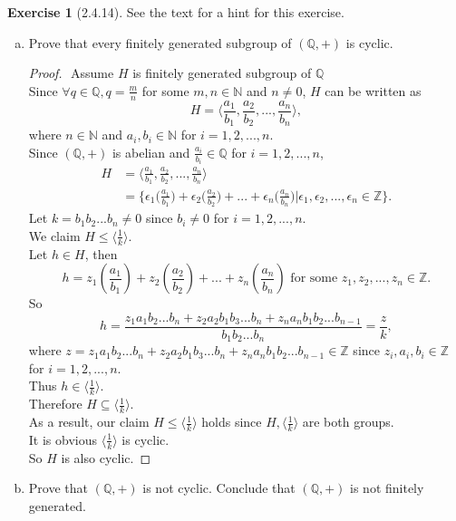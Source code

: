 \documentclass{amsart}
\newcommand{\bbz}{\mathbb{Z}}
\newcommand{\bbq}{\mathbb{Q}}
\newcommand{\bbn}{\mathbb{N}}
\theoremstyle{plain}
\theoremstyle{definition}
\newtheorem{exer}[lem]{Exercise}
\begin{document}
\begin{exer}[2.4.14]
See the text for a hint for this exercise.
\begin{enumerate}[(a)]
\item Prove that every finitely generated subgroup of $(\bbq,+)$ is cyclic.
	\begin{proof}
		$ $\newline
		Assume $H$ is finitely generated subgroup of $\bbq$\\ 
		Since $\forall q \in \bbq, q = \frac{m}{n}$ for some $m,n\in \bbn$ and $n \neq 0$, $H$ can be written as 
		$$H = \Big\langle \frac{a_1}{b_1},\frac{a_2}{b_2},...,\frac{a_n}{b_n} \Big\rangle,$$ 
		where $n \in \bbn$ and $a_i,b_i \in \bbn $ for $i =1,2,...,n$. \\
		Since $(\bbq,+)$ is abelian and $\frac{a_i}{b_i} \in \bbq$ for $i = 1,2,...,n$, 
		\begin{align*}
			H &= \Big\langle \frac{a_1}{b_1},\frac{a_2}{b_2},...,\frac{a_n}{b_n} \Big\rangle \\
			  &= \Big\{\epsilon_1\big(\frac{a_1}{b_1}\big)+\epsilon_2\big(\frac{a_2}{b_2}\big) + ...+\epsilon_n\big(\frac{a_n}{b_n}\big)|\epsilon_1,\epsilon_2,...,\epsilon_n \in \bbz\Big\}. 
	    \end{align*}
		Let $k = b_1b_2...b_n \neq 0$ since $b_i \neq 0$ for $i =1,2,...,n$.\\
		We claim $H \leq \langle \frac{1}{k} \rangle$.\\
	    Let $h \in H$, then 
	    $$h = z_1(\frac{a_1}{b_1})+z_2(\frac{a_2}{b_2}) + ...+z_n(\frac{a_n}{b_n}) \text{ for some } z_1,z_2,...,z_n \in \bbz.$$
	    So 
	    $$h = \frac{z_1a_1b_2...b_n + z_2a_2b_1b_3...b_n + z_na_nb_1b_2...b_{n-1}}{b_1b_2...b_n} = \frac{z}{k},$$
	    where $z = z_1a_1b_2...b_n + z_2a_2b_1b_3...b_n + z_na_nb_1b_2...b_{n-1} \in \bbz$ since $z_i,a_i,b_i \in \bbz$ for $i = 1,2,...,n$.\\
	    Thus $h \in \langle \frac{1}{k} \rangle$.\\
	    Therefore $H \subseteq \langle \frac{1}{k} \rangle$.\\
	    As a result, our claim $H \leq \langle \frac{1}{k} \rangle$ holds since $H, \langle \frac{1}{k} \rangle $ are both groups.\\
	    It is obvious $\langle \frac{1}{k} \rangle$ is cyclic.\\
	    So $H$ is also cyclic.
	\end{proof}
\item Prove that $(\bbq,+)$ is not cyclic.
Conclude that $(\bbq,+)$ is not finitely generated.

\end{enumerate}
\end{exer}
\end{document}
